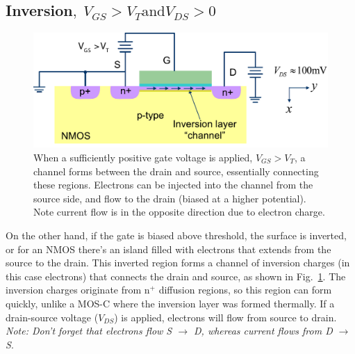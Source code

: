 \subsection{Inversion\texorpdfstring{$,\;V_{GS}>V_T\text{and}V_{DS}>0$}{}}
\begin{figure}[tb]
\centering
\includegraphics[width=.75\columnwidth]{mos_triode}
\caption{When a sufficiently positive gate voltage is applied, $V_{GS} > V_T$, a channel forms between the drain and source, essentially connecting these regions.  Electrons can be injected into the channel from the source side, and flow to the drain (biased at a higher potential).  Note current flow is in the opposite direction due to electron charge.}
\label{fig:mos_triode}
\end{figure}
On the other hand, if the gate is biased above threshold, the surface is inverted, or for an NMOS there's an island filled with electrons that extends from the source to the drain.   This inverted region forms a channel of inversion charges (in this case electrons) that connects the drain and source, as shown in Fig.~\ref{fig:mos_triode}.  The inversion charges originate from n$^+$ diffusion regions, so this region can form quickly, unlike a MOS-C where the inversion layer was formed thermally. If a drain-source voltage ($V_{DS}$) is applied, electrons will flow from source to drain.  
 \textit{Note: Don't forget that electrons flow S $\rightarrow$ D, whereas current flows from D $\rightarrow$ S}.
